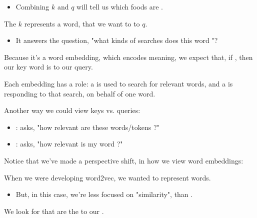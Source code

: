 \begin{itemize}
\begin{itemize}
                \item Combining $k$ and $q$ will tell us which foods are .\\

            \end{itemize}

            \begin{definition}
                The  $k$ represents a word, that we want to  to  $q$.

                \begin{itemize}
                    \item It answers the question, "what kinds of searches does this word "?
                \end{itemize}

                Because it's a word embedding, which encodes meaning, we expect that, if , then our key word is  to our query.
            \end{definition}
        \end{itemize}

        Each embedding has a role: a  is used to search for relevant words, and a  is responding to that search, on behalf of one word.

        \begin{concept}
            Another way we could view keys vs. queries:

            \begin{itemize}
                \item {}: asks, "how relevant are these words/tokens ?"

                \item {}: asks, "how relevant is my word ?"
            \end{itemize}
        \end{concept}


        Notice that we've made a perspective shift, in how we view word embeddings:\\

        \begin{concept}
            When we were developing word2vec, we wanted  to represent  words.

            \begin{itemize}
                \item But, in this case, we're less focused on "similarity", than .
            \end{itemize}

            We look for  that are the  to our .

        \end{concept}

